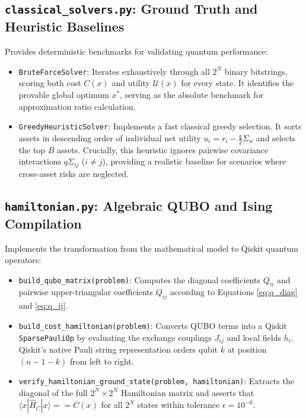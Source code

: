\subsection{\texttt{classical\_solvers.py}: Ground Truth and Heuristic Baselines}
Provides deterministic benchmarks for validating quantum performance:
\begin{itemize}
    \item \texttt{BruteForceSolver}: Iterates exhaustively through all $2^N$ binary bitstrings, scoring both cost $C(x)$ and utility $\mathcal{U}(x)$ for every state. It identifies the provable global optimum $x^*$, serving as the absolute benchmark for approximation ratio calculation.
    \item \texttt{GreedyHeuristicSolver}: Implements a fast classical greedy selection. It sorts assets in descending order of individual net utility $u_i = r_i - \frac{q}{2}\Sigma_{ii}$ and selects the top $B$ assets. Crucially, this heuristic ignores pairwise covariance interactions $q \Sigma_{ij}$ ($i \neq j$), providing a realistic baseline for scenarios where cross-asset risks are neglected.
\end{itemize}

\subsection{\texttt{hamiltonian.py}: Algebraic QUBO and Ising Compilation}
Implements the transformation from the mathematical model to Qiskit quantum operators:
\begin{itemize}
    \item \texttt{build\_qubo\_matrix(problem)}: Computes the diagonal coefficients $Q_{ii}$ and pairwise upper-triangular coefficients $Q_{ij}$ according to Equations \eqref{eq:q_diag} and \eqref{eq:q_ij}.
    \item \texttt{build\_cost\_hamiltonian(problem)}: Converts QUBO terms into a Qiskit \texttt{SparsePauliOp} by evaluating the exchange couplings $J_{ij}$ and local fields $h_i$. Qiskit's native Pauli string representation orders qubit $k$ at position $(n - 1 - k)$ from left to right.
    \item \texttt{verify\_hamiltonian\_ground\_state(problem, hamiltonian)}: Extracts the diagonal of the full $2^N \times 2^N$ Hamiltonian matrix and asserts that $\langle x | \hat{H}_C | x \rangle == C(x)$ for all $2^N$ states within tolerance $\epsilon = 10^{-6}$.
\end{itemize}

